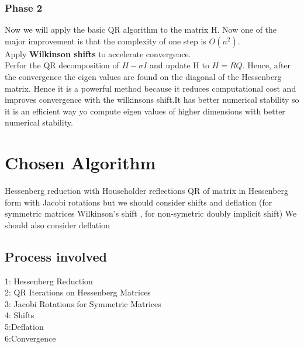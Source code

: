\documentclass[a4paper,12pt]{article}
\begin{document}
  \subsubsection{Phase 2} 
  Now we will apply the basic QR algorithm to the matrix H. Now one of the major improvement is that the complexity of one step is $O(n^2)$.\\
  Apply \textbf{Wilkinson shifts} to accelerate convergence.\\
  Perfor the QR decomposition of $H-\sigma I$ and update H to $H=RQ$. Hence, after the convergence the eigen values are found on the diagonal of the Hessenberg matrix. Hence it is a powerful method because it reduces computational cost and improves convergence with the wilkinsons shift.It has better numerical stability so it is an efficient way yo compute eigen values of higher dimensions with better numerical stability.
  \section{Chosen Algorithm}
 Hessenberg reduction with Householder reflections QR of matrix in Hessenberg form with Jacobi rotations but we should consider shifts and deflation (for symmetric matrices Wilkinson's shift , for non-symetric doubly implicit shift) We should also consider deflation\\
 \subsection{Process involved}
 1: Hessenberg Reduction\\
 2: QR Iterations on Hessenberg Matrices\\
 3: Jacobi Rotations for Symmetric Matrices\\
 4: Shifts\\
 5:Deflation\\
 6:Convergence\\
\end{document}
